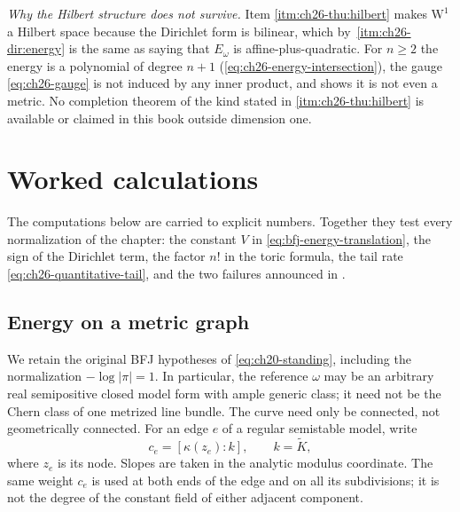 \begin{remark}
\emph{Why the Hilbert structure does not survive.}  Item
\cref{itm:ch26-thu:hilbert} makes \(\mathrm W^1\) a Hilbert space because the
Dirichlet form is bilinear, which by
\,\cref{itm:ch26-dir:energy} is the same
as saying that \(E_\omega\) is affine-plus-quadratic.  For \(n\geq2\) the
energy is a polynomial of degree \(n+1\)
(\eqref{eq:ch26-energy-intersection}), the gauge
\eqref{eq:ch26-gauge} is not induced by any inner product, and
 shows it is not even a metric.  No completion
theorem of the kind stated in \cref{itm:ch26-thu:hilbert} is available or
claimed in this book outside dimension one.
\end{remark}

\section{Worked calculations}
\label{sec:ch26-examples}

The computations below are carried to explicit numbers.  Together they
test every normalization of the chapter: the constant \(V\) in
\eqref{eq:bfj-energy-translation}, the sign of the Dirichlet term, the
factor \(n!\) in the toric formula, the tail rate
\eqref{eq:ch26-quantitative-tail}, and the two failures announced in
.

\subsection{Energy on a metric graph}
\label{sec:ch26-ex-graph}

We retain the original BFJ hypotheses of \eqref{eq:ch20-standing},
including the normalization \(-\log|\pi|=1\).  In particular, the
reference \(\omega\) may be an arbitrary real semipositive closed model
form with ample generic class; it need not be the Chern class of one
metrized line bundle.  The curve need only be connected, not geometrically
connected.  For an edge \(e\) of a regular semistable model, write
\[
 c_e=[\kappa(z_e):k],\qquad k=\widetilde K,
\]
where \(z_e\) is its node.  Slopes are taken in the analytic modulus
coordinate.  The same weight \(c_e\) is used at both ends of the edge
and on all its subdivisions; it is not the degree of the constant field
of either adjacent component.

